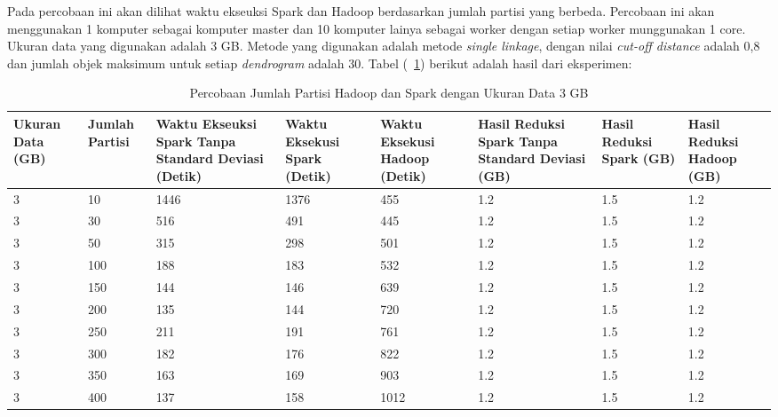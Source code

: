 Pada percobaan ini akan dilihat waktu ekseuksi Spark dan Hadoop berdasarkan jumlah partisi yang berbeda. Percobaan ini akan menggunakan 1 komputer sebagai komputer master dan 10 komputer lainya sebagai worker dengan setiap worker munggunakan 1 core. Ukuran data yang digunakan adalah 3 GB. Metode yang digunakan adalah metode \textit{single linkage}, dengan nilai \textit{cut-off distance} adalah 0,8 dan jumlah objek maksimum untuk setiap \textit{dendrogram} adalah 30. Tabel (~\ref{tab:spark3}) berikut adalah hasil dari eksperimen:

\begin{table}[H] 
	\centering 
	\caption{Percobaan Jumlah Partisi Hadoop dan Spark dengan Ukuran Data 3 GB}
	\label{tab:spark3}
	\begin{tabular}{|p{1cm}|p{1cm}|p{2cm}|p{2cm}|p{2cm}|p{2cm}|p{2cm}|p{2cm}|}
\hline
Ukuran Data (GB) & Jumlah Partisi &  Waktu Ekseuksi Spark Tanpa Standard Deviasi (Detik) & Waktu Eksekusi Spark (Detik) & Waktu Eksekusi Hadoop (Detik) & Hasil Reduksi Spark Tanpa Standard Deviasi (GB) & Hasil Reduksi Spark (GB)  & Hasil Reduksi Hadoop (GB)\\ 
\hline
3 & 10 & 1446 & 1376 & 455 & 1.2 & 1.5 & 1.2 \\
\hline
3 & 30 & 516 & 491 & 445 & 1.2 & 1.5 & 1.2 \\
\hline
3 & 50 & 315 & 298 & 501 & 1.2 & 1.5 & 1.2 \\
\hline
3 & 100 & 188 & 183 & 532 & 1.2 & 1.5 & 1.2 \\
\hline
3 & 150 & 144 & 146 & 639 & 1.2 & 1.5 & 1.2 \\
\hline
3 & 200 & 135 & 144 & 720 & 1.2 & 1.5 & 1.2 \\
\hline
3 & 250 & 211 & 191 & 761 & 1.2 & 1.5 & 1.2 \\
\hline
3 & 300 & 182 & 176 & 822 & 1.2 & 1.5 & 1.2 \\
\hline
3 & 350 & 163 & 169 & 903 & 1.2 & 1.5 & 1.2 \\
\hline
3 & 400 & 137 & 158 & 1012 & 1.2 & 1.5 & 1.2 \\
\hline


\hline

	\end{tabular} 
\end{table}



\def\scl{1}

\def\leg{} 
\def\std{none}
\def\ymin{}
\def\ymax{}

